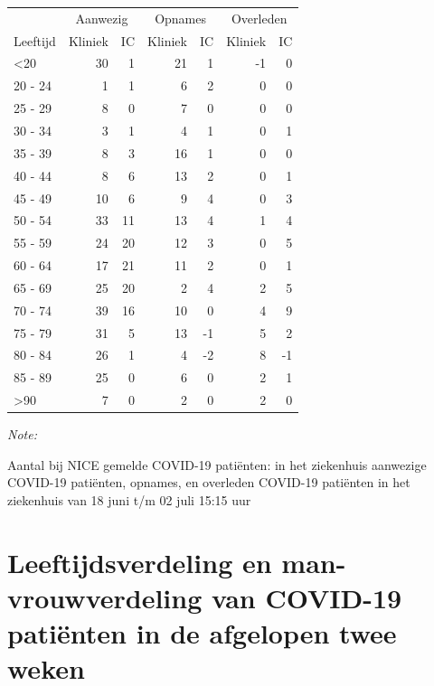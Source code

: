\documentclass[
  english,
  man,floatsintext]{apa6}
\begin{document}
\begin{table}
\centering\begingroup\fontsize{10}{12}\selectfont

\begin{threeparttable}
\begin{tabular}{lrrrrrr}
\toprule
\multicolumn{1}{c}{ } & \multicolumn{2}{c}{Aanwezig} & \multicolumn{2}{c}{Opnames} & \multicolumn{2}{c}{Overleden} \\
\cmidrule(l{3pt}r{3pt}){2-3} \cmidrule(l{3pt}r{3pt}){4-5} \cmidrule(l{3pt}r{3pt}){6-7}
Leeftijd & Kliniek & IC & Kliniek & IC & Kliniek & IC\\
\midrule
<20 & 30 & 1 & 21 & 1 & -1 & 0\\
20 - 24 & 1 & 1 & 6 & 2 & 0 & 0\\
25 - 29 & 8 & 0 & 7 & 0 & 0 & 0\\
30 - 34 & 3 & 1 & 4 & 1 & 0 & 1\\
35 - 39 & 8 & 3 & 16 & 1 & 0 & 0\\
40 - 44 & 8 & 6 & 13 & 2 & 0 & 1\\
45 - 49 & 10 & 6 & 9 & 4 & 0 & 3\\
50 - 54 & 33 & 11 & 13 & 4 & 1 & 4\\
55 - 59 & 24 & 20 & 12 & 3 & 0 & 5\\
60 - 64 & 17 & 21 & 11 & 2 & 0 & 1\\
65 - 69 & 25 & 20 & 2 & 4 & 2 & 5\\
70 - 74 & 39 & 16 & 10 & 0 & 4 & 9\\
75 - 79 & 31 & 5 & 13 & -1 & 5 & 2\\
80 - 84 & 26 & 1 & 4 & -2 & 8 & -1\\
85 - 89 & 25 & 0 & 6 & 0 & 2 & 1\\
>90 & 7 & 0 & 2 & 0 & 2 & 0\\
\bottomrule
\end{tabular}
\begin{tablenotes}
\item \textit{Note: } 
\item Aantal bij NICE gemelde COVID-19 patiënten: in het ziekenhuis aanwezige COVID-19 patiënten, opnames, en overleden COVID-19 patiënten in het ziekenhuis van 18 juni t/m 02 juli 15:15 uur
\end{tablenotes}
\end{threeparttable}
\endgroup{}
\end{table}

\newpage

\hypertarget{leeftijdsverdeling-en-man-vrouwverdeling-van-covid-19-patiuxebnten-in-de-afgelopen-twee-weken}{%
\section{Leeftijdsverdeling en man-vrouwverdeling van COVID-19 patiënten in de afgelopen twee weken}\label{leeftijdsverdeling-en-man-vrouwverdeling-van-covid-19-patiuxebnten-in-de-afgelopen-twee-weken}}
\end{document}
